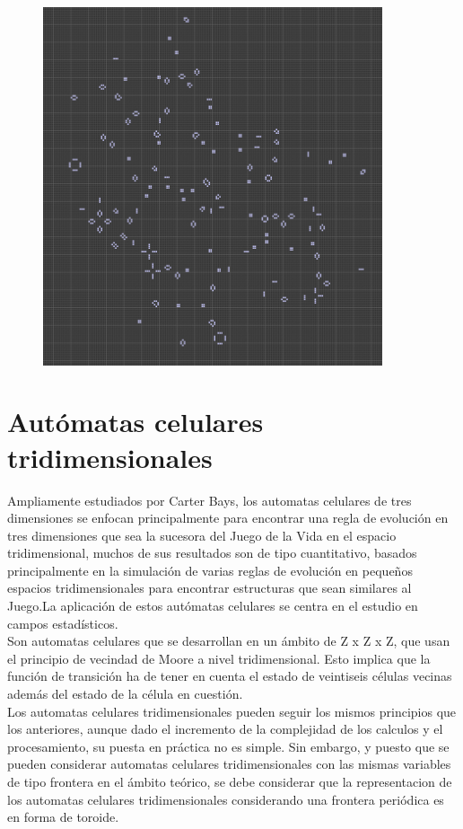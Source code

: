 \documentclass[14pt]{article}
\begin{document}
\begin{figure}[htp]
\centering
\includegraphics[width=10.0cm]{8.jpg}
\label{fig:lion}
\end{figure}

\clearpage

\section{Autómatas celulares tridimensionales}

Ampliamente estudiados por Carter Bays, los automatas celulares de tres dimensiones se enfocan principalmente para encontrar una regla de evolución en tres dimensiones que sea la sucesora del Juego de la Vida en el espacio tridimensional, muchos de sus resultados son de tipo cuantitativo, basados principalmente en la simulación de varias reglas de evolución en pequeños espacios tridimensionales para encontrar estructuras que sean similares al Juego.La aplicación de estos autómatas celulares se centra en el estudio en campos estadísticos.\\

Son automatas celulares que se desarrollan en un ámbito de Z x Z x Z, que usan el principio de vecindad de Moore a nivel tridimensional. Esto implica que la función de transición ha de tener en cuenta el estado de veintiseis células vecinas además del estado de la célula en cuestión.\\

Los automatas celulares tridimensionales pueden seguir los mismos principios que los anteriores, aunque dado el incremento de la complejidad de los calculos y el procesamiento, su puesta en práctica no es simple. Sin embargo, y puesto que se pueden considerar automatas celulares tridimensionales con las mismas variables de tipo frontera en el ámbito teórico, se debe considerar que la representacion de los automatas celulares tridimensionales considerando una frontera periódica es en forma de toroide. 
\end{document}
